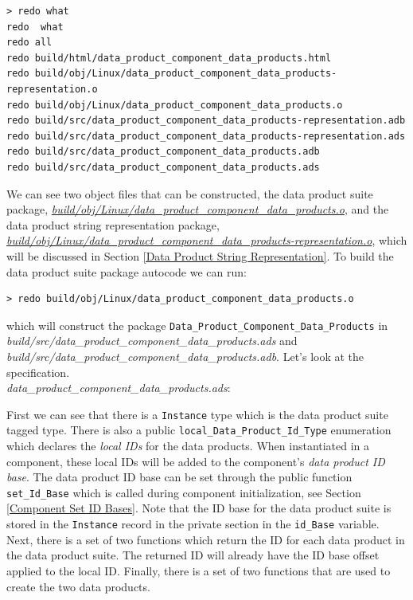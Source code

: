 \vspace{5mm} %
\begin{verbatim}
> redo what 
redo  what
redo all
redo build/html/data_product_component_data_products.html
redo build/obj/Linux/data_product_component_data_products-representation.o
redo build/obj/Linux/data_product_component_data_products.o
redo build/src/data_product_component_data_products-representation.adb
redo build/src/data_product_component_data_products-representation.ads
redo build/src/data_product_component_data_products.adb
redo build/src/data_product_component_data_products.ads
\end{verbatim}
\vspace{5mm} %

We can see two object files that can be constructed, the data product suite package, \textit{\url{build/obj/Linux/data\_product\_component\_data\_products.o}}, and the data product string representation package, \textit{\url{build/obj/Linux/data\_product\_component\_data\_products-representation.o}}, which will be discussed in Section \ref{Data Product String Representation}. To build the data product suite package autocode we can run:

\vspace{5mm} %
\begin{verbatim}
> redo build/obj/Linux/data_product_component_data_products.o
\end{verbatim}
\vspace{5mm} %

which will construct the package \texttt{Data\_Product\_Component\_Data\_Products} in \textit{build/src/data\_product\_component\_data\_products.ads} and \textit{build/src/data\_product\_component\_data\_products.adb}. Let's look at the specification. \\

\textit{data\_product\_component\_data\_products.ads}:

First we can see that there is a \texttt{Instance} type which is the data product suite tagged type. There is also a public \texttt{local\_Data\_Product\_Id\_Type} enumeration which declares the \textit{local IDs} for the data products. When instantiated in a component, these local IDs will be added to the component's \textit{data product ID base}. The data product ID base can be set through the public function \texttt{set\_Id\_Base} which is called during component initialization, see Section \ref{Component Set ID Bases}. Note that the ID base for the data product suite is stored in the \texttt{Instance} record in the private section in the \texttt{id\_Base} variable. Next, there is a set of two functions which return the ID for each data product in the data product suite. The returned ID will already have the ID base offset applied to the local ID. Finally, there is a set of two functions that are used to create the two data products. \\

